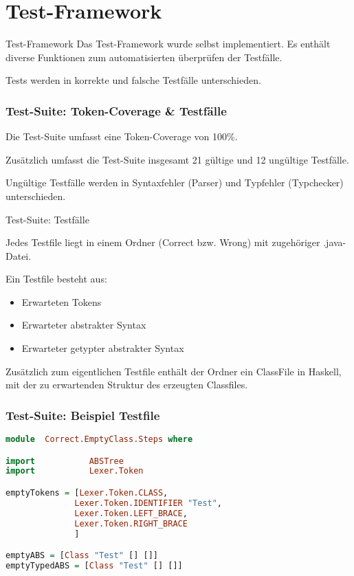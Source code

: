 \section{Test-Framework}

\begin{frame}{Test-Framework}
Das Test-Framework wurde selbst implementiert. Es enthält diverse Funktionen zum automatisierten überprüfen der Testfälle.

\par \medskip

Tests werden in korrekte und falsche Testfälle unterschieden.


\end{frame}

\begin{frame}[fragile]
	\frametitle{Test-Suite: Token-Coverage \& Testfälle}
	
Die Test-Suite umfasst eine Token-Coverage von 100\%. 

\par \medskip

Zusätzlich umfasst die Test-Suite insgesamt 21 gültige und 12 ungültige Testfälle.

\par \medskip

Ungültige Testfälle werden in Syntaxfehler (Parser) und Typfehler (Typchecker) unterschieden.
\end{frame}

\begin{frame}{Test-Suite: Testfälle}

Jedes Testfile liegt in einem Ordner (Correct bzw. Wrong) mit zugehöriger .java-Datei. 	

\par \medskip

Ein Testfile besteht aus: 

\begin{itemize}
	\item Erwarteten Tokens
	\item Erwarteter abstrakter Syntax
	\item Erwarteter getypter abstrakter Syntax
\end{itemize}

Zusätzlich zum eigentlichen Testfile enthält der Ordner ein ClassFile in Haskell, mit der zu erwartenden Struktur des erzeugten Classfiles.
\end{frame}

\begin{frame}[fragile]
\frametitle{Test-Suite: Beispiel Testfile}
\begin{lstlisting}[language=Haskell]
module  Correct.EmptyClass.Steps where

import           ABSTree
import           Lexer.Token

emptyTokens = [Lexer.Token.CLASS,
              Lexer.Token.IDENTIFIER "Test",
              Lexer.Token.LEFT_BRACE,
              Lexer.Token.RIGHT_BRACE
              ]

emptyABS = [Class "Test" [] []]
emptyTypedABS = [Class "Test" [] []]	
\end{lstlisting}
	
\end{frame}

